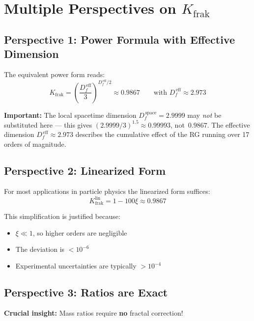 		\section{Multiple Perspectives on $K_{\text{frak}}$}
	
	\subsection{Perspective 1: Power Formula with Effective Dimension}
	
	The equivalent power form reads:
	\begin{equation}
		K_{\text{frak}} = \left(\frac{D_f^{\,\text{eff}}}{3}\right)^{D_f^{\,\text{eff}}/2} \approx 0.9867 \qquad \text{with } D_f^{\,\text{eff}} \approx 2.973
		\label{eq:exact_kfrak_en}
	\end{equation}
	
	\textbf{Important:} The local spacetime dimension $D_f^{\,\text{space}} = 2.9999$ may \emph{not} be substituted here --- this gives $(2.9999/3)^{1.5} \approx 0.99993$, not~$0.9867$. The effective dimension $D_f^{\,\text{eff}} \approx 2.973$ describes the cumulative effect of the RG running over 17 orders of magnitude.
	
	\subsection{Perspective 2: Linearized Form}
	
	For most applications in particle physics the linearized form suffices:
	\begin{equation}
		K_{\text{frak}}^{\text{lin}} = 1 - 100\xi \approx 0.9867
		\label{eq:linear_kfrak_en}
	\end{equation}
	
	This simplification is justified because:
	\begin{itemize}
		\item $\xi \ll 1$, so higher orders are negligible
		\item The deviation is $< 10^{-6}$
		\item Experimental uncertainties are typically $> 10^{-4}$
	\end{itemize}
	
	\subsection{Perspective 3: Ratios are Exact}
	
	\textbf{Crucial insight:} Mass ratios require \textbf{no} fractal correction!
	

